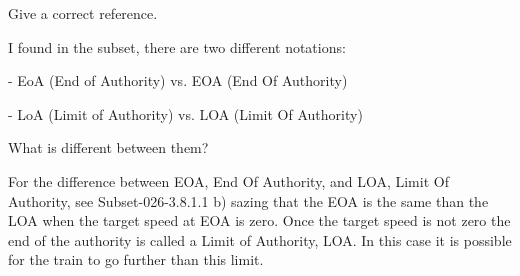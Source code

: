 \documentclass{template/openetcs_article}
\begin{document}
\resolution
Give a correct reference.

I found in the subset, there are two different notations:

- EoA (End of Authority) vs. EOA (End Of Authority)

- LoA (Limit of Authority) vs. LOA (Limit Of Authority)

What is different between them?

\resolution
For the difference between EOA, End Of Authority, and LOA, Limit Of Authority, see  Subset-026-3.8.1.1 b) sazing that the EOA is the same than the LOA when the target speed at EOA is zero.
Once the target speed is not zero the end of the authority is called a Limit of Authority, LOA. In this case it is possible for the train to go further than this limit.









\end{document}
